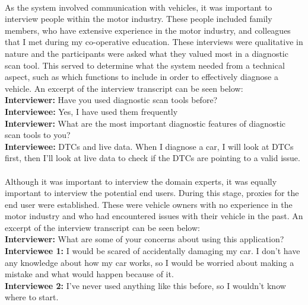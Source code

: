 	\paragraph{}{
	As the system involved communication with vehicles, it was important to interview people within the motor industry. These people included family members, who have extensive experience in the motor industry, and colleagues that I met during my co-operative education. These interviews were qualitative in nature and the participants were asked what they valued most in a diagnostic scan tool. This served to determine what the system needed from a technical aspect, such as which functions to include in order to effectively diagnose a vehicle. An excerpt of the interview transcript can be seen below:\\
	
	\noindent \textbf{Interviewer: }  Have you used diagnostic scan tools before? \\
	\textbf{Interviewee: }  Yes, I have used them frequently \\
	\noindent \textbf{Interviewer: }  What are the most important diagnostic features of diagnostic scan tools to you? \\
	\textbf{Interviewee: }  DTCs and live data. When I diagnose a car, I will look at DTCs first, then I'll look at live data to check if the DTCs are pointing to a valid issue.\\
	}
	\paragraph{}{
	Although it was important to interview the domain experts, it was equally important to interview the potential end users. During this stage, proxies for the end user were established. These were vehicle owners with no experience in the motor industry and who had encountered issues with their vehicle in the past. An excerpt of the interview transcript can be seen below:\\

	
	\noindent \textbf{Interviewer: }  What are some of your concerns about using this application? \\
	\textbf{Interviewee 1: }  I would be scared of accidentally damaging my car. I don't have any knowledge about how my car works, so I would be worried about making a mistake and what would happen because of it.\\
	\textbf{Interviewee 2: }  I've never used anything like this before, so I wouldn't know where to start.
	}

